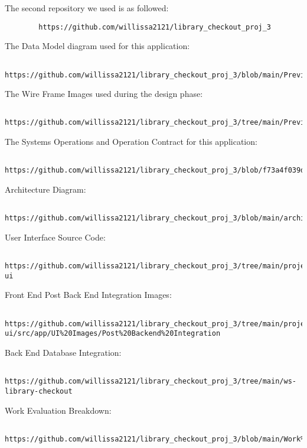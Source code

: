 \documentclass{article}
\begin{document}
	The second repository we used is as followed: 
	\begin{verbatim}
		https://github.com/willissa2121/library_checkout_proj_3
	\end{verbatim}

	The Data Model diagram used for this application:
	\begin{lstlisting}
		https://github.com/willissa2121/library_checkout_proj_3/blob/main/Previous%20Repo%20Work/Domain%20Models/Iteration%202/UML.png
	\end{lstlisting}

	The Wire Frame Images used during the design phase:
	\begin{lstlisting}
		https://github.com/willissa2121/library_checkout_proj_3/tree/main/Previous%20Repo%20Work/Documenation/Wireframes/Iteration%201
	\end{lstlisting}

	The Systems Operations and Operation Contract for this application: 
	\begin{lstlisting}
		https://github.com/willissa2121/library_checkout_proj_3/blob/f73a4f039dedd2f664073461a1e1754665f06aa7/Previous%20Repo%20Work/Documenation/System%20Ops%20and%20Contracts/Iteration%201/systemops_contracts.pdf
	\end{lstlisting}

	Architecture Diagram: 
	\begin{lstlisting}
		https://github.com/willissa2121/library_checkout_proj_3/blob/main/architecture/app_architecture_guide.pdf
	\end{lstlisting}

	User Interface Source Code:
	\begin{lstlisting}
	https://github.com/willissa2121/library_checkout_proj_3/tree/main/project-ui
	\end{lstlisting}

	Front End Post Back End Integration Images:
	\begin{lstlisting}
		https://github.com/willissa2121/library_checkout_proj_3/tree/main/project-ui/src/app/UI%20Images/Post%20Backend%20Integration
	\end{lstlisting}

	Back End Database Integration:
	\begin{lstlisting}
		https://github.com/willissa2121/library_checkout_proj_3/tree/main/ws-library-checkout
	\end{lstlisting}

	Work Evaluation Breakdown:
	\begin{lstlisting}
	https://github.com/willissa2121/library_checkout_proj_3/blob/main/Work%20Review/Completed_Work_Review_Group_Project.pdf
	\end{lstlisting}	
\end{document}

